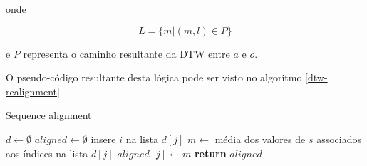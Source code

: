\noindent onde

\begin{equation*}
  L = \{m | (m, l) \in P\}
\end{equation*}

\noindent e $P$ representa o caminho resultante da DTW entre $a$ e $o$.

O pseudo-código resultante desta lógica pode ser visto no algoritmo \ref{dtw-realignment}

\begin{algorithm}
\caption{Sequence alignment}\label{dtw-realignment}
\begin{algorithmic}[1]
    \State $d \gets \emptyset$ 
    \State $aligned \gets \emptyset$
        \State insere $i$ na lista $d[j]$
    \EndFor
        \State $m \gets$ média dos valores de $s$ associados aos índices na lista $d[j]$
        \State $aligned[j] \gets m$
    \EndFor
\State \textbf{return} $aligned$
\EndProcedure
\end{algorithmic}
\end{algorithm}
